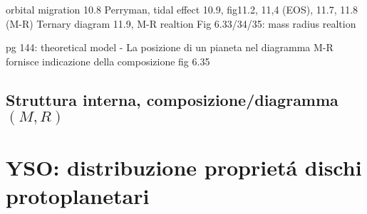 \begin{workout}[M-R diagram]
orbital migration 10.8 Perryman, tidal effect 10.9, 
fig11.2, 11,4 (EOS), 11.7, 11.8 (M-R)
Ternary diagram 11.9, M-R realtion
Fig 6.33/34/35: mass radius realtion

pg 144: theoretical model - La posizione di un pianeta nel diagramma M-R fornisce indicazione della composizione
fig 6.35
\end{workout}


\section{Struttura interna, composizione/diagramma $(M,R)$}

{\let\clearpage\relax\let\cleardoublepage\relax
\chapter{YSO: distribuzione propriet\'a dischi protoplanetari}
}

